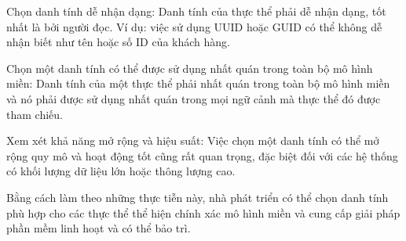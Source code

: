 Chọn danh tính dễ nhận dạng: Danh tính của thực thể phải dễ nhận dạng, tốt nhất là bởi người đọc. Ví dụ: việc sử dụng UUID hoặc GUID có thể không dễ nhận biết như tên hoặc số ID của khách hàng.

Chọn một danh tính có thể được sử dụng nhất quán trong toàn bộ mô hình miền: Danh tính của một thực thể phải nhất quán trong toàn bộ mô hình miền và nó phải được sử dụng nhất quán trong mọi ngữ cảnh mà thực thể đó được tham chiếu.

Xem xét khả năng mở rộng và hiệu suất: Việc chọn một danh tính có thể mở rộng quy mô và hoạt động tốt cũng rất quan trọng, đặc biệt đối với các hệ thống có khối lượng dữ liệu lớn hoặc thông lượng cao.

Bằng cách làm theo những thực tiễn này, nhà phát triển có thể chọn danh tính phù hợp cho các thực thể thể hiện chính xác mô hình miền và cung cấp giải pháp phần mềm linh hoạt và có thể bảo trì.





